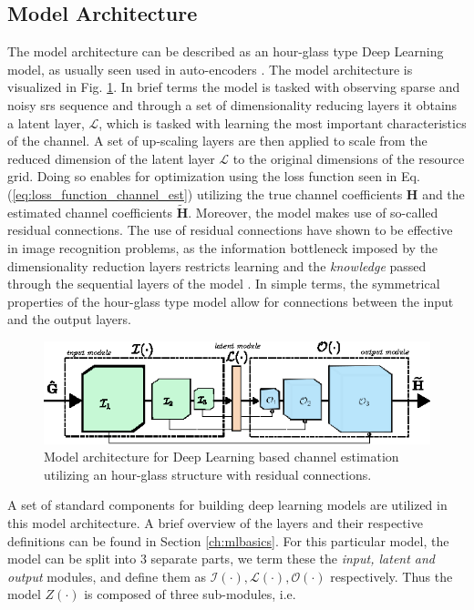 \subsection{Model Architecture}
The model architecture can be described as an hour-glass type Deep Learning model, as usually seen used in auto-encoders \cite{Nielsen2015}. The model architecture is visualized in Fig. \ref{fig:model_architecture_channel_estimation}. In brief terms the model is tasked with observing sparse and noisy \gls{srs} sequence and through a set of dimensionality reducing layers it obtains a latent layer, $\mathcal{L}$, which is tasked with learning the most important characteristics of the channel. A set of up-scaling layers are then applied to scale from the reduced dimension of the latent layer $\mathcal{L}$ to the original dimensions of the resource grid. Doing so enables for optimization using the loss function seen in Eq. (\ref{eq:loss_function_channel_est}) utilizing the true channel coefficients $\mathbf{H}$ and the estimated channel coefficients $\mathbf{\widetilde{H}}$. Moreover, the model makes use of so-called residual connections. The use of residual connections have shown to be effective in image recognition problems, as the information bottleneck imposed by the dimensionality reduction layers restricts learning and the \emph{knowledge} passed through the sequential layers of the model \cite{He2016DeepRecognition}. In simple terms, the symmetrical properties of the hour-glass type model allow for connections between the input and the output layers. 

\begin{figure}
    \centering
    \includegraphics{chapters/part_uplink/figures/model_architecture.eps}
    \caption{Model architecture for Deep Learning based channel estimation utilizing an hour-glass structure with residual connections.}
    \label{fig:model_architecture_channel_estimation}
\end{figure}

A set of standard components for building deep learning models are utilized in this model architecture. A brief overview of the layers and their respective definitions can be found in Section \ref{ch:mlbasics}. For this particular model, the model can be split into 3 separate parts, we term these the \emph{input, latent and output} modules, and define them as $\mathcal{I}(\cdot), \mathcal{L}(\cdot), \mathcal{O}(\cdot)$ respectively. Thus the model $Z(\cdot)$ is composed of three sub-modules, i.e. 

